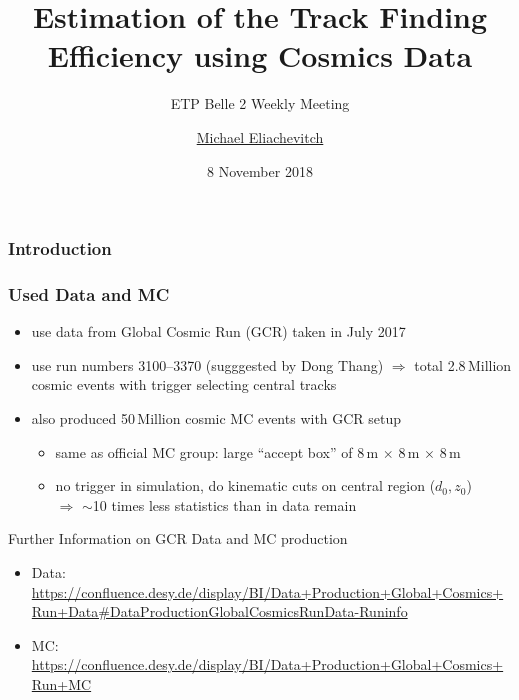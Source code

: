 \documentclass[18pt]{beamer}
\title{Estimation of the Track Finding Efficiency using Cosmics Data}
\subtitle{ETP Belle 2 Weekly Meeting}
\author{\underline{Michael Eliachevitch}}
\date{8 November 2018}
\institute{ETP -- KIT}
\begin{document}
  
  \begin{frame}
  \titlepage
\end{frame}

\begin{frame}
  
  \frametitle{Introduction}
  
\end{frame}

\begin{frame}
  \frametitle{Used Data and MC}

      \begin{itemize}
    \item use data from Global Cosmic Run (GCR) taken in July 2017
    \item use run numbers 3100--3370 (sugggested by Dong Thang)
      $\Rightarrow$ total 2.8\,Million cosmic events with trigger selecting central tracks\\
    \item also produced 50\,Million cosmic MC events with GCR setup
      \begin{itemize}
      \item same as official MC group: large ``accept box'' of 8\,m $\times$ 8\,m $\times$ 8\,m 
      \item no trigger in simulation, do kinematic cuts on central region ($d_0, z_0$)\\
        $\Rightarrow$  $\sim$10 times less statistics than in data remain
      \end{itemize}
    \end{itemize}

    \begin{block}{Further Information on GCR Data and MC production}
      \begin{itemize}
      \item Data: \footnotesize{\url{https://confluence.desy.de/display/BI/Data+Production+Global+Cosmics+Run+Data\#DataProductionGlobalCosmicsRunData-Runinfo}}
      \item MC: \footnotesize{\url{https://confluence.desy.de/display/BI/Data+Production+Global+Cosmics+Run+MC}}
      \end{itemize}
    \end{block}
  
\end{frame}
\end{document}
